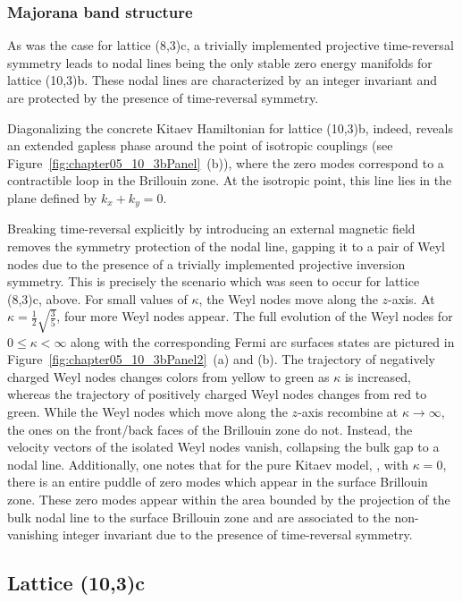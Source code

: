 %
%
\subsubsection{Majorana band structure}
%
%
As was the case for lattice (8,3)c, a trivially implemented projective time-reversal symmetry leads to nodal lines being the only stable zero energy manifolds for lattice (10,3)b.
These nodal lines are characterized by an integer invariant and are protected by the presence of time-reversal symmetry.

Diagonalizing the concrete Kitaev Hamiltonian for lattice (10,3)b, indeed, reveals an extended gapless phase around the point of isotropic couplings (see Figure~\ref{fig:chapter05_10_3bPanel}~(b)), where the zero modes correspond to a contractible loop in the Brillouin zone.
At the isotropic point, this line lies in the plane defined by $k_x + k_y = 0$.

Breaking time-reversal explicitly by introducing an external magnetic field removes the symmetry protection of the nodal line, gapping it to a pair of Weyl nodes due to the presence of a trivially implemented projective inversion symmetry.
This is precisely the scenario which was seen to occur for lattice (8,3)c, above.
For small values of $\kappa$, the Weyl nodes move along the $z$-axis.
At $\kappa = \frac{1}{2} \sqrt{\frac{3}{5}}$, four more Weyl nodes appear.
The full evolution of the Weyl nodes for $0 \leq \kappa < \infty$ along with the corresponding Fermi arc surfaces states are pictured in Figure~\ref{fig:chapter05_10_3bPanel2}~(a) and (b).
The trajectory of negatively charged Weyl nodes changes colors from yellow to green as $\kappa$ is increased, whereas the trajectory of positively charged Weyl nodes changes from red to green.
While the Weyl nodes which move along the $z$-axis recombine at $\kappa \rightarrow \infty$, the ones on the front/back faces of the Brillouin zone do not.
Instead, the velocity vectors of the isolated Weyl nodes vanish, collapsing the bulk gap to a nodal line.
Additionally, one notes that for the pure Kitaev model, \ie, with $\kappa = 0$, there is an entire puddle of zero modes which appear in the surface Brillouin zone.
These zero modes appear within the area bounded by the projection of the bulk nodal line to the surface Brillouin zone and are associated to the non-vanishing integer invariant due to the presence of time-reversal symmetry.


%
%
\subsection{Lattice (10,3)c}
\label{section:chapter05_10_3c}
%
%
